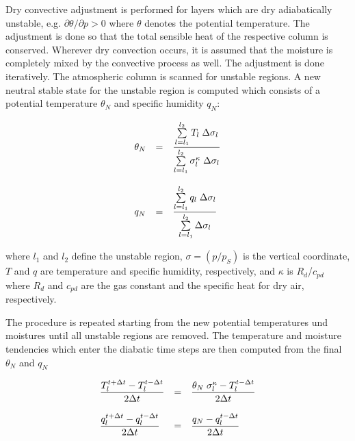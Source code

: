 Dry convective adjustment is performed for layers which are dry adiabatically unstable, e.g.
$\partial \theta / \partial p > 0$ where $\theta$ denotes the potential temperature. The adjustment
is done so that the total sensible heat of the respective column is conserved. Wherever dry
convection occurs, it is assumed that the moisture is completely mixed by the convective
process as well. The adjustment is done iteratively. The atmospheric column is scanned for
unstable regions. A new neutral stable state for the unstable region is computed which consists
of a potential temperature $\theta_N$ and specific humidity $q_N$:

\begin{equation}
\begin{array}{lcl}

\displaystyle \theta_N & = & \displaystyle \frac{\sum\limits_{l=l_1}^{l_2} T_l \; \Delta\sigma_l}
{\sum\limits_{l=l_1}^{l_2} \sigma_l^{\kappa} \; \Delta\sigma_l} \\
&&\\
\displaystyle q_N & = & \displaystyle \frac{\sum\limits_{l=l_1}^{l_2} q_l \; \Delta\sigma_l}
{\sum\limits_{l=l_1}^{l_2} \Delta\sigma_l} \\
\end{array}
\end{equation}

where $l_1$ and $l_2$ define the unstable region, $\sigma = (p/p_S)$ is the vertical coordinate,
$T$ and $q$ are temperature and specific humidity, respectively, and $\kappa$ is
$R_d$/$c_{pd}$ where $R_d$ and $c_{pd}$ are the gas constant and the specific heat for dry
air,
respectively.

The procedure is repeated starting from the new potential temperatures und moistures until all
unstable regions are removed. The temperature and moisture tendencies which enter the diabatic
time steps are then computed from the final $\theta_N$ and $q_N$

\begin{equation}
\begin{array}{lcl}
\displaystyle \frac{T_l^{t+\Delta t}-T_l^{t-\Delta t}}{2\Delta t} & = & \displaystyle \frac{\theta_N
 \; \sigma_l^{\kappa} -T_l^{t-\Delta t}}{2\Delta t} \\
&&\\
\displaystyle \frac{q_l^{t+\Delta t}-q_l^{t-\Delta t}}{2\Delta t} & = & \displaystyle \frac{q_N - q_l^{t-\Delta
t}}{2\Delta t} 
\end{array}
\end{equation}

\newpage

